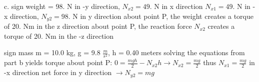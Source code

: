 c. sign weight = 98. N in -y direction, $N_{x2} = 49.$ N in x direction\newline
$N_{x1} = 49.$ N in -x direction, $N_{y2} = 98.$ N in y direction\newline
about point P, the weight creates a torque of 20. Nm in the z direction\newline
about point P, the reaction force $N_{x2}$ creates a torque of 20. Nm in the -z direction\newline

sign mass m = 10.0 kg, g = 9.8 $\frac{m}{s^{2}}$, h = 0.40 meters\newline
solving the equations from part b yields\newline
torque about point P: $0 = \frac{mgh}{2} - N_{x2}h \rightarrow N_{x2} = \frac{mg}{2}$\newline
thus $N_{x1} = \frac{mg}{2}$ in -x direction\newline
net force in y direction $\rightarrow N_{y2} = mg$
